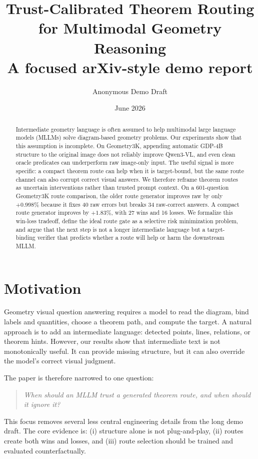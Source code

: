 \documentclass[11pt]{article}
\title{Trust-Calibrated Theorem Routing for Multimodal Geometry Reasoning\\
\large A focused arXiv-style demo report}
\author{Anonymous Demo Draft}
\date{June 2026}
\begin{document}
\maketitle

\begin{abstract}
Intermediate geometry language is often assumed to help multimodal large language models (MLLMs) solve diagram-based geometry problems. Our experiments show that this assumption is incomplete. On Geometry3K, appending automatic GDP-4B structure to the original image does not reliably improve Qwen3-VL, and even clean oracle predicates can underperform raw image-only input. The useful signal is more specific: a compact theorem route can help when it is target-bound, but the same route channel can also corrupt correct visual answers. We therefore reframe theorem routes as uncertain interventions rather than trusted prompt context. On a 601-question Geometry3K route comparison, the older route generator improves raw by only \(+0.998\%\) because it fixes 40 raw errors but breaks 34 raw-correct answers. A compact route generator improves by \(+1.83\%\), with 27 wins and 16 losses. We formalize this win-loss tradeoff, define the ideal route gate as a selective risk minimization problem, and argue that the next step is not a longer intermediate language but a target-binding verifier that predicts whether a route will help or harm the downstream MLLM.
\end{abstract}

\section{Motivation}
Geometry visual question answering requires a model to read the diagram, bind labels and quantities, choose a theorem path, and compute the target. A natural approach is to add an intermediate language: detected points, lines, relations, or theorem hints. However, our results show that intermediate text is not monotonically useful. It can provide missing structure, but it can also override the model's correct visual judgment.

The paper is therefore narrowed to one question:
\begin{quote}
\emph{When should an MLLM trust a generated theorem route, and when should it ignore it?}
\end{quote}
This focus removes several less central engineering details from the long demo draft. The core evidence is: (i) structure alone is not plug-and-play, (ii) routes create both wins and losses, and (iii) route selection should be trained and evaluated counterfactually.
\end{document}
